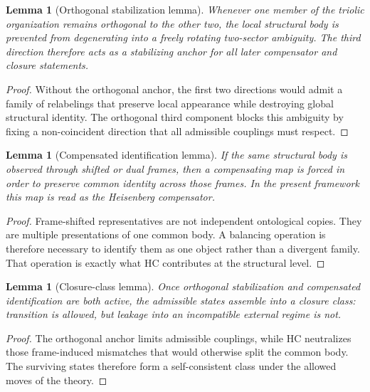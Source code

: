 \documentclass[12pt,a4paper]{article}
\newtheorem{lemma}[theorem]{Lemma}
\begin{document}
\begin{lemma}[Orthogonal stabilization lemma]
\label{lem:orthogonal-stabilization-lemma}
Whenever one member of the triolic organization remains orthogonal to the other
 two, the local structural body is prevented from degenerating into a freely
rotating two-sector ambiguity. The third direction therefore acts as a
stabilizing anchor for all later compensator and closure statements.
\end{lemma}

\begin{proof}
Without the orthogonal anchor, the first two directions would admit a family of
relabelings that preserve local appearance while destroying global structural
identity. The orthogonal third component blocks this ambiguity by fixing a
non-coincident direction that all admissible couplings must respect.
\end{proof}

\begin{lemma}[Compensated identification lemma]
\label{lem:compensated-identification-lemma}
If the same structural body is observed through shifted or dual frames, then a
compensating map is forced in order to preserve common identity across those
frames. In the present framework this map is read as the Heisenberg
compensator.
\end{lemma}

\begin{proof}
Frame-shifted representatives are not independent ontological copies. They are
multiple presentations of one common body. A balancing operation is therefore
necessary to identify them as one object rather than a divergent family. That
operation is exactly what HC contributes at the structural level.
\end{proof}

\begin{lemma}[Closure-class lemma]
\label{lem:closure-class-lemma}
Once orthogonal stabilization and compensated identification are both active,
the admissible states assemble into a closure class: transition is allowed,
but leakage into an incompatible external regime is not.
\end{lemma}

\begin{proof}
The orthogonal anchor limits admissible couplings, while HC neutralizes those
frame-induced mismatches that would otherwise split the common body. The
surviving states therefore form a self-consistent class under the allowed
moves of the theory.
\end{proof}
\end{document}

